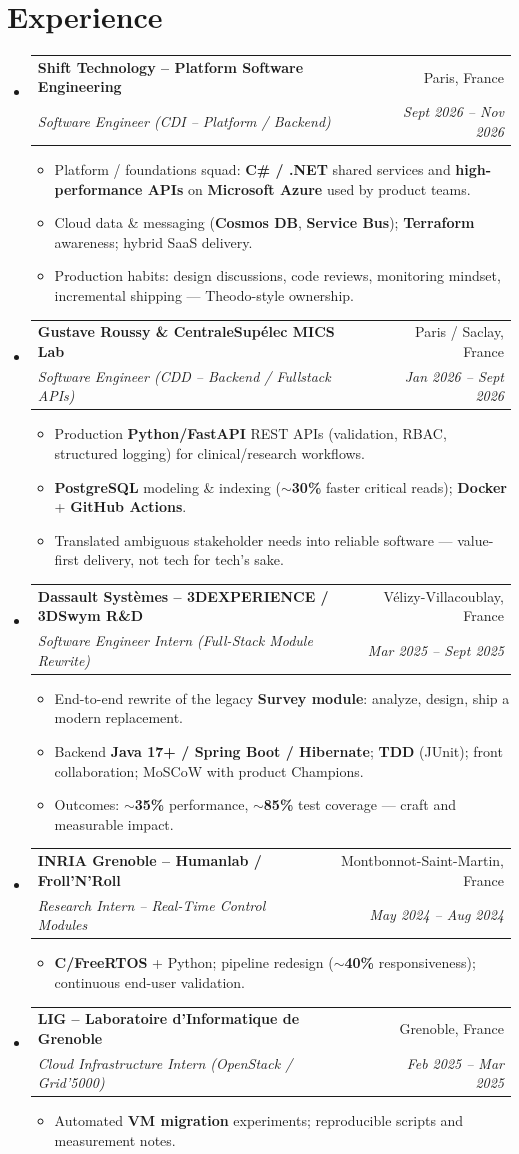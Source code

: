 \documentclass[letterpaper,10.5pt]{article}
\makeatletter
\newcommand{\resumeItem}[1]{\item\small{#1 \vspace{-1.5pt}}}
\newcommand{\resumeSubheading}[4]{\vspace{-1pt}\item\begin{tabular*}{0.97\textwidth}[t]{l@{\extracolsep{\fill}}r}\textbf{#1} & #2 \\\textit{\small#3} & \textit{\small #4} \\\end{tabular*}\vspace{-5pt}}
\newcommand{\resumeSubHeadingListStart}{\begin{itemize}[leftmargin=0.15in, label={}]}
\newcommand{\resumeSubHeadingListEnd}{\end{itemize}}
\newcommand{\resumeItemListStart}{\begin{itemize}[leftmargin=0.18in]}
\newcommand{\resumeItemListEnd}{\end{itemize}\vspace{-3pt}}
\makeatother
\begin{document}
\section{Experience}
\resumeSubHeadingListStart
  \resumeSubheading
    {Shift Technology -- Platform Software Engineering}{Paris, France}
    {Software Engineer (CDI -- Platform / Backend)}{Sept 2026 -- Nov 2026}
    \resumeItemListStart
      \resumeItem{Platform / foundations squad: \textbf{C\# / .NET} shared services and \textbf{high-performance APIs} on \textbf{Microsoft Azure} used by product teams.}
      \resumeItem{Cloud data \& messaging (\textbf{Cosmos DB}, \textbf{Service Bus}); \textbf{Terraform} awareness; hybrid SaaS delivery.}
      \resumeItem{Production habits: design discussions, code reviews, monitoring mindset, incremental shipping --- Theodo-style ownership.}
    \resumeItemListEnd
  \resumeSubheading
    {Gustave Roussy \& CentraleSup\'elec MICS Lab}{Paris / Saclay, France}
    {Software Engineer (CDD -- Backend / Fullstack APIs)}{Jan 2026 -- Sept 2026}
    \resumeItemListStart
      \resumeItem{Production \textbf{Python/FastAPI} REST APIs (validation, RBAC, structured logging) for clinical/research workflows.}
      \resumeItem{\textbf{PostgreSQL} modeling \& indexing (\textbf{$\sim$30\%} faster critical reads); \textbf{Docker} + \textbf{GitHub Actions}.}
      \resumeItem{Translated ambiguous stakeholder needs into reliable software --- value-first delivery, not tech for tech's sake.}
    \resumeItemListEnd
  \resumeSubheading
    {Dassault Syst\`emes -- 3DEXPERIENCE / 3DSwym R\&D}{V\'elizy-Villacoublay, France}
    {Software Engineer Intern (Full-Stack Module Rewrite)}{Mar 2025 -- Sept 2025}
    \resumeItemListStart
      \resumeItem{End-to-end rewrite of the legacy \textbf{Survey module}: analyze, design, ship a modern replacement.}
      \resumeItem{Backend \textbf{Java 17+ / Spring Boot / Hibernate}; \textbf{TDD} (JUnit); front collaboration; MoSCoW with product Champions.}
      \resumeItem{Outcomes: \textbf{$\sim$35\%} performance, \textbf{$\sim$85\%} test coverage --- craft and measurable impact.}
    \resumeItemListEnd
  \resumeSubheading
    {INRIA Grenoble -- Humanlab / Froll'N'Roll}{Montbonnot-Saint-Martin, France}
    {Research Intern -- Real-Time Control Modules}{May 2024 -- Aug 2024}
    \resumeItemListStart
      \resumeItem{\textbf{C/FreeRTOS} + Python; pipeline redesign (\textbf{$\sim$40\%} responsiveness); continuous end-user validation.}
    \resumeItemListEnd
  \resumeSubheading
    {LIG -- Laboratoire d'Informatique de Grenoble}{Grenoble, France}
    {Cloud Infrastructure Intern (OpenStack / Grid'5000)}{Feb 2025 -- Mar 2025}
    \resumeItemListStart
      \resumeItem{Automated \textbf{VM migration} experiments; reproducible scripts and measurement notes.}
    \resumeItemListEnd
\resumeSubHeadingListEnd
\end{document}
